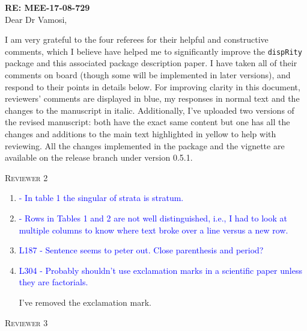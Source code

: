 \documentclass[12pt,letterpaper]{article}
\renewcommand{\section}[1]{%
\bigskip
\begin{center}
\begin{Large}
\normalfont\scshape #1
\medskip
\end{Large}
\end{center}}
\begin{document}
\textbf{RE: MEE-17-08-729 }\\
\bigskip
Dear Dr Vamosi,\\
\bigskip

I am very grateful to the four referees for their helpful and constructive comments, which I believe have helped me to significantly improve the \texttt{dispRity} package and this associated package description paper.
I have taken all of their comments on board (though some will be implemented in later versions), and respond to their points in details below.
For improving clarity in this document, reviewers' comments are displayed in blue, my responses in normal text and the changes to the manuscript in italic.
Additionally, I've uploaded two versions of the revised manuscript: both have the exact same content but one has all the changes and additions to the main text highlighted in yellow to help with reviewing.
All the changes implemented in the package and the vignette are available on the release branch under version 0.5.1.

%
%


\section{Reviewer 2}

\begin{enumerate}

\item{\textcolor{blue}{- In table 1 the singular of strata is stratum.}}

\item{\textcolor{blue}{- Rows in Tables 1 and 2 are not well distinguished, i.e., I had to look at multiple columns to know where text broke over a line versus a new row.}}

\item{\textcolor{blue}{L187 - Sentence seems to peter out. Close parenthesis and period?}}

\item{\textcolor{blue}{L304 - Probably shouldn't use exclamation marks in a scientific paper unless they are factorials.}}

I've removed the exclamation mark.

\end{enumerate}


\section{Reviewer 3}
\end{document}

